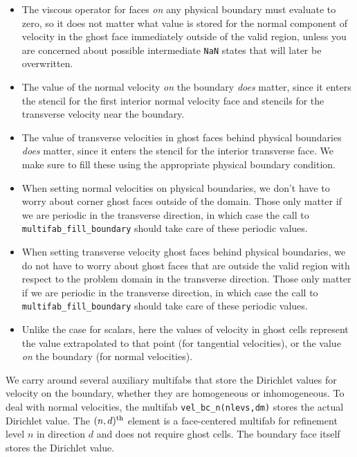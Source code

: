 \documentclass[final]{siamltex}
\begin{document}
\begin{itemize}
\item The viscous operator for faces {\it on} any physical boundary must
evaluate to zero, so it does not matter what value is stored for the normal component
of velocity in the ghost face immediately outside of the valid region, unless you 
are concerned 
about possible intermediate {\tt NaN} states that will later be overwritten.\\
\item The value of the normal velocity {\it on} the boundary {\it does} matter, since it
enters the stencil for the first interior normal velocity face and stencils for the
transverse velocity near the boundary.\\
\item The value of transverse velocities in ghost faces behind physical boundaries
{\it does} matter, since it enters the stencil for the interior transverse face.
We make sure to fill these using the appropriate physical boundary condition.\\
\item When setting normal velocities on physical boundaries, we don't have to worry
about corner ghost faces outside of the domain.  Those only matter if we are periodic 
in the transverse
direction, in which case the call to {\tt multifab\_fill\_boundary} should take care of
these periodic values.\\
\item When setting transverse velocity ghost faces behind physical boundaries, we do
not have to worry about ghost faces that are outside the valid region with respect
to the problem domain in the transverse direction.  Those only matter if we are 
periodic in the transverse direction, in which case the call to {\tt multifab\_fill\_boundary}
should take care of these periodic values.\\
\item Unlike the case for scalars, here the values of velocity in ghost cells represent
the value extrapolated to that point (for tangential velocities), or the value {\it on}
the boundary (for normal velocities).\\
\end{itemize}

We carry around several auxiliary multifabs that store the Dirichlet values 
for velocity on the
boundary, whether they are homogeneous or inhomogeneous.  To deal with normal 
velocities, the multifab {\tt vel\_bc\_n(nlevs,dm)}
stores the actual Dirichlet value.  The $(n,d)^{\rm th}$ element is a face-centered
multifab for refinement level $n$ in direction $d$ and does not require ghost cells.
The boundary face itself stores the Dirichlet value.\\
\end{document}
